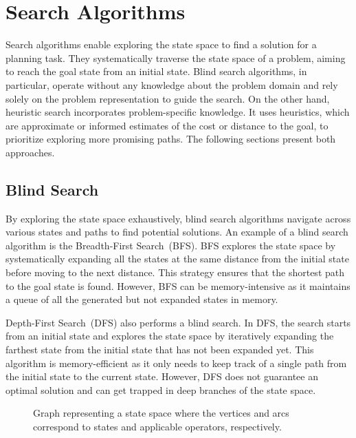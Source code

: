\section{Search Algorithms}
\label{sec:search-algorithms}

Search algorithms enable exploring the state space to find a solution for a planning task. They systematically traverse the state space of a problem, aiming to reach the goal state from an initial state. Blind search algorithms, in particular, operate without any knowledge about the problem domain and rely solely on the problem representation to guide the search. On the other hand, heuristic search incorporates problem-specific knowledge. It uses heuristics, which are approximate or informed estimates of the cost or distance to the goal, to prioritize exploring more promising paths. The following sections present both approaches.

\subsection{Blind Search}
\label{sec:blind-search}

By exploring the state space exhaustively, blind search algorithms navigate across various states and paths to find potential solutions. An example of a blind search algorithm is the Breadth-First Search~(BFS). BFS explores the state space by systematically expanding all the states at the same distance from the initial state before moving to the next distance. This strategy ensures that the shortest path to the goal state is found. However, BFS can be memory-intensive as it maintains a queue of all the generated but not expanded states in memory.

Depth-First Search~(DFS) also performs a blind search. In DFS, the search starts from an initial state and explores the state space by iteratively expanding the farthest state from the initial state that has not been expanded yet. This algorithm is memory-efficient as it only needs to keep track of a single path from the initial state to the current state. However, DFS does not guarantee an optimal solution and can get trapped in deep branches of the state space.

\begin{figure}[ht]
    \caption[Graph representing a state space.]{Graph representing a state space where the vertices and arcs correspond to states and applicable operators, respectively.}
    \label{fig:statespace}
    \addmargin
    \centering
    
\end{figure}

